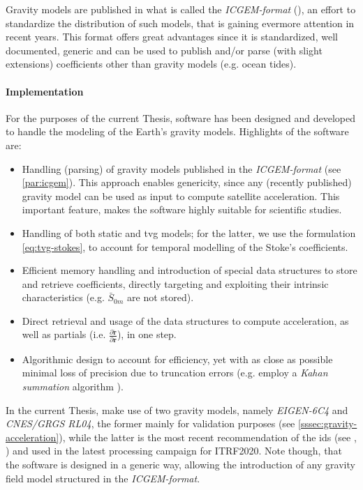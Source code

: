 Gravity models are published in what is called the \emph{ICGEM-format} 
(\cite{ICGEMFormat}), an effort to standardize the distribution of such models, 
that is gaining evermore attention in recent years. This format offers great 
advantages since it is standardized, well documented, generic and can be used to 
publish and/or parse (with slight extensions) coefficients other than gravity 
models (e.g. ocean tides).

\paragraph{Implementation}\label{par:implementation}
For the purposes of the current Thesis, software has been designed and developed 
to handle the modeling of the Earth's gravity models. Highlights of the software 
are:
\begin{itemize}
  \item Handling (parsing) of gravity models published in the \emph{ICGEM-format} 
    (see \autoref{par:icgem}). This approach enables genericity, since any (recently 
    published) gravity model can be used as input to compute satellite acceleration.
    This important feature, makes the software highly suitable for scientific studies.
  \item Handling of both static and \gls{tvg} models; for the latter, we use the 
    formulation \autoref{eq:tvg-stokes}, to account for temporal modelling of the 
    Stoke's coefficients.
  \item Efficient memory handling and introduction of special data structures to 
    store and retrieve coefficients, directly targeting and exploiting their intrinsic
    characteristics (e.g. $\bar{S}_{0m}$ are not stored).
  \item Direct retrieval and usage of the data structures to compute acceleration, 
    as well as partials (i.e. $\frac{\partial \bm{\ddot{r}}}{\partial \bm{r}}$), 
    in one step.
  \item Algorithmic design to account for efficiency, yet with as close as possible 
    minimal loss of precision due to truncation errors (e.g. employ a 
    \emph{Kahan summation} algorithm \cite{Klein2006}).
\end{itemize}

In the current Thesis, make use of two gravity models, namely \emph{EIGEN-6C4} 
\cite{Forste2014} and \emph{CNES/GRGS RL04}, the former mainly for validation 
purposes (see \autoref{sssec:gravity-acceleration}), while the latter is the most 
recent recommendation of the \gls{ids} (see \cite{ids-standards-itrf2020}, \cite{stepanek2022}) 
and used in the latest processing campaign for ITRF2020. Note though, that the software 
is designed in a generic way, allowing the introduction of any gravity field model 
structured in the \emph{ICGEM-format}.

